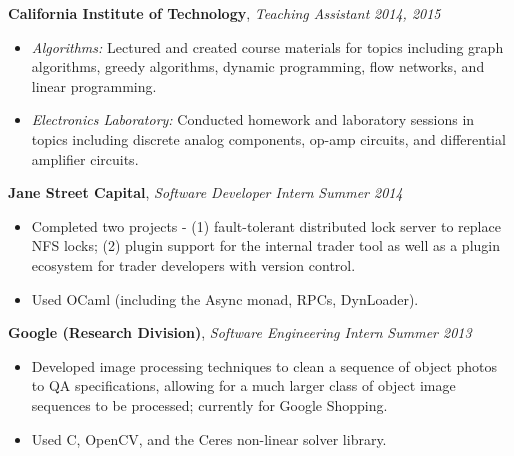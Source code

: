 \documentclass{article}
\newenvironment{changemargin}[2]{%
  \begin{list}{}{%
    \setlength{\topsep}{0pt}%
    \setlength{\leftmargin}{#1}%
    \setlength{\rightmargin}{#2}%
    \setlength{\listparindent}{\parindent}%
    \setlength{\itemindent}{\parindent}%
    \setlength{\parsep}{\parskip}%
  }%
  \item[]}{\end{list}
}
\newenvironment{body} {
	\vspace*{-16pt}
	\begin{changemargin}{-0.25in}{-0.5in}
  }	
	{\end{changemargin}
}
\newcommand{\CC}{C\nolinebreak\hspace{-.05em}\raisebox{.4ex}{\tiny\bf +}\nolinebreak\hspace{-.10em}\raisebox{.4ex}{\tiny\bf +}}
\begin{document}
\begin{body}
	\smallskip

	\textbf{California Institute of Technology}, \emph{Teaching Assistant} \hfill \emph{2014, 2015} \\
	\vspace*{-4pt}
	\begin{itemize}
		\item \emph{Algorithms:} Lectured and created course materials for topics including graph algorithms, greedy algorithms, dynamic programming, flow networks, and linear programming.
		\item \emph{Electronics Laboratory:} Conducted homework and laboratory sessions in topics including discrete analog components, op-amp circuits, and differential amplifier circuits.
	\end{itemize}

	\smallskip

	\textbf{Jane Street Capital}, \emph{Software Developer Intern} \hfill \emph{Summer 2014}\\
	\vspace*{-4pt}
	\begin{itemize}
		\item Completed two projects - (1) fault-tolerant distributed lock server to replace NFS locks; (2) plugin support for the internal trader tool as well as a plugin ecosystem for trader developers with version control.
		\item Used OCaml (including the Async monad, RPCs, DynLoader).
	\end{itemize}

	\smallskip

	\textbf{Google (Research Division)}, \emph{Software Engineering Intern} \hfill \emph{Summer 2013}\\
	\vspace*{-4pt}
	\begin{itemize}
		\item Developed image processing techniques to clean a sequence of object photos to QA specifications, allowing for a much larger class of object image sequences to be processed; currently for Google Shopping.
		\item Used \CC, OpenCV, and the Ceres non-linear solver library.
	\end{itemize}


\end{body}
\end{document}
